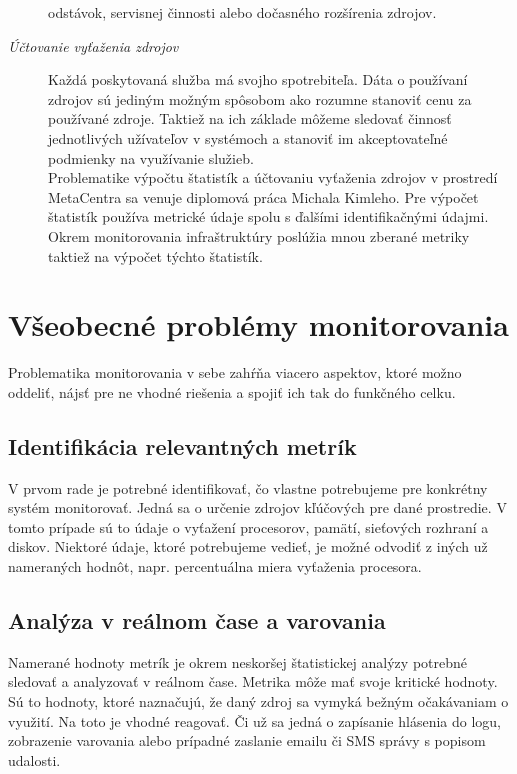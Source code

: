 \documentclass[printed,11pt,twoside,color,cover,table]{fithesis3}
\begin{document}
\begin{description}
odstávok, servisnej činnosti alebo dočasného rozšírenia zdrojov.
\item[\emph{Účtovanie vyťaženia zdrojov}]
Každá poskytovaná služba má svojho spotrebiteľa. Dáta o používaní zdrojov sú jediným možným spôsobom ako rozumne stanoviť cenu za používané zdroje.
Taktiež na ich základe môžeme sledovať činnosť jednotlivých užívateľov v systémoch a stanoviť im akceptovateľné podmienky na využívanie služieb.
\\Problematike výpočtu štatistík a účtovaniu vyťaženia zdrojov v prostredí MetaCentra sa venuje diplomová práca Michala Kimleho\cite{uctovanie}.
Pre výpočet štatistík používa metrické údaje spolu s ďalšími identifikačnými údajmi. Okrem monitorovania infraštruktúry poslúžia
mnou zberané metriky taktiež na výpočet týchto štatistík.
\end{description}

\section{Všeobecné problémy monitorovania}
Problematika monitorovania v sebe zahŕňa viacero aspektov, ktoré možno oddeliť, nájsť pre ne vhodné riešenia a spojiť ich tak do funkčného celku. 

\subsection{Identifikácia relevantných metrík}
V prvom rade je potrebné identifikovať, čo vlastne potrebujeme pre konkrétny systém monitorovať. Jedná sa o určenie zdrojov kľúčových pre dané prostredie. V tomto prípade sú to údaje o vyťažení
procesorov, pamätí, sieťových rozhraní a diskov. Niektoré údaje, ktoré potrebujeme vedieť, je možné odvodiť z iných už nameraných hodnôt, napr. percentuálna miera vyťaženia procesora. 

\subsection{Analýza v reálnom čase a varovania}
Namerané hodnoty metrík je okrem neskoršej štatistickej analýzy potrebné sledovať a analyzovať v reálnom čase. Metrika môže mať svoje kritické hodnoty. Sú to hodnoty, ktoré naznačujú, že daný zdroj sa vymyká bežným očakávaniam o využití.
Na toto je vhodné reagovať. Či už sa jedná o zapísanie hlásenia do logu, zobrazenie varovania alebo prípadné zaslanie emailu či SMS správy s popisom udalosti.
\end{document}
